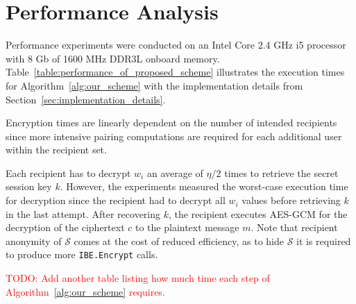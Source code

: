 \section{Performance Analysis}
Performance experiments were conducted on an Intel Core 2.4 GHz i5 processor with 8 Gb of 1600 MHz DDR3L onboard memory. Table~\ref{table:performance_of_proposed_scheme} illustrates the  execution times for Algorithm~\ref{alg:our_scheme} with the implementation details from Section~\ref{sec:implementation_details}. 

Encryption times are linearly dependent on the number of intended recipients since more intensive pairing computations are required for each additional user within the recipient set.

Each recipient has to decrypt $w_i$ an average of $\eta/2$ times to retrieve the secret session key $k$. However, the experiments measured the worst-case execution time for decryption since the recipient had to decrypt all $w_i$ values before retrieving $k$ in the last attempt. After recovering $k$, the recipient executes AES-GCM for the decryption of the ciphertext $c$ to the plaintext message $m$. Note that recipient anonymity of $\mathcal{S}$ comes at the cost of reduced efficiency, as to hide $\mathcal{S}$ it is required to produce more \texttt{IBE.Encrypt} calls.

\textcolor{red}{TODO: Add another table listing how much time each step of Algorithm~\ref{alg:our_scheme} requires.}

